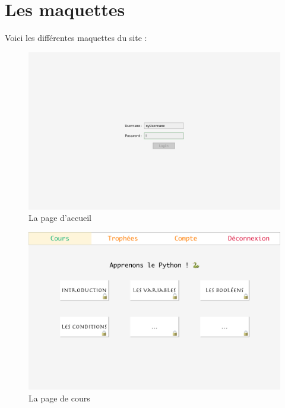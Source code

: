 \section*{Les maquettes}
\label{sec:maquettes}

Voici les différentes maquettes du site :

\begin{figure}[!h]
    \centering
    \includegraphics[scale=0.14]{textures/images/annexes/maquettes/1-Login.png}
    \caption{La page d'accueil}
\end{figure}
\begin{figure}[!h]
    \centering
    \includegraphics[scale=0.14]{textures/images/annexes/maquettes/21-Sommaire.png}
    \caption{La page de cours}
\end{figure}

\newpage

